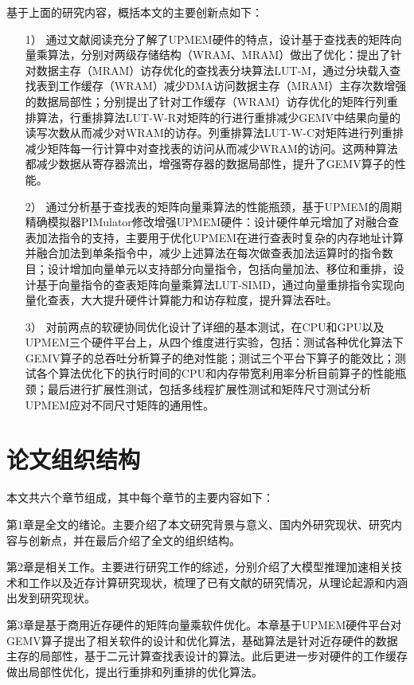 基于上面的研究内容，概括本文的主要创新点如下：
\begin{itemize}
	\item [1）]
	通过文献阅读充分了解了UPMEM硬件的特点，设计基于查找表的矩阵向量乘算法，分别对两级存储结构（WRAM、MRAM）做出了优化：提出了针对数据主存（MRAM）访存优化的查找表分块算法LUT-M，通过分块载入查找表到工作缓存（WRAM）减少DMA访问数据主存（MRAM）主存次数增强的数据局部性；分别提出了针对工作缓存（WRAM）访存优化的矩阵行列重排算法，行重排算法LUT-W-R对矩阵的行进行重排减少GEMV中结果向量的读写次数从而减少对WRAM的访存。列重排算法LUT-W-C对矩阵进行列重排减少矩阵每一行计算中对查找表的访问从而减少WRAM的访问。这两种算法都减少数据从寄存器流出，增强寄存器的数据局部性，提升了GEMV算子的性能。
	\item [2）]
	通过分析基于查找表的矩阵向量乘算法的性能瓶颈，基于UPMEM的周期精确模拟器PIMulator修改增强UPMEM硬件：设计硬件单元增加了对融合查表加法指令的支持，主要用于优化UPMEM在进行查表时复杂的内存地址计算并融合加法到单条指令中，减少上述算法在每次做查表加法运算时的指令数目；设计增加向量单元以支持部分向量指令，包括向量加法、移位和重排，设计基于向量指令的查表矩阵向量乘算法LUT-SIMD，通过向量重排指令实现向量化查表，大大提升硬件计算能力和访存粒度，提升算法吞吐。
    \item [3）]
	对前两点的软硬协同优化设计了详细的基本测试，在CPU和GPU以及UPMEM三个硬件平台上，从四个维度进行实验，包括：测试各种优化算法下GEMV算子的总吞吐分析算子的绝对性能；测试三个平台下算子的能效比；测试各个算法优化下的执行时间的CPU和内存带宽利用率分析目前算子的性能瓶颈；最后进行扩展性测试，包括多线程扩展性测试和矩阵尺寸测试分析UPMEM应对不同尺寸矩阵的通用性。
\end{itemize}

\section{论文组织结构}
本文共六个章节组成，其中每个章节的主要内容如下：

第1章是全文的绪论。主要介绍了本文研究背景与意义、国内外研究现状、研究内容与创新点，并在最后介绍了全文的组织结构。

第2章是相关工作。主要进行研究工作的综述，分别介绍了大模型推理加速相关技术和工作以及近存计算研究现状，梳理了已有文献的研究情况，从理论起源和内涵出发到研究现状。

第3章是基于商用近存硬件的矩阵向量乘软件优化。本章基于UPMEM硬件平台对GEMV算子提出了相关软件的设计和优化算法，基础算法是针对近存硬件的数据主存的局部性，基于二元计算查找表设计的算法。此后更进一步对硬件的工作缓存做出局部性优化，提出行重排和列重排的优化算法。

